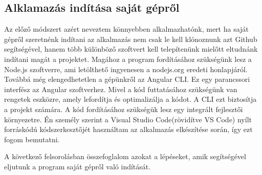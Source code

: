 \subsection{Alklamazás indítása saját gépről}
Az előző  módszert azért neveztem könnyebben alkalmazhatónk, mert ha saját gépről szeretnénk indítani az alkalmazás nem csak le kell klónoznunk azt Github segítségével, hanem több különböző szoftvert kell telepítenünk mielőtt eltudnánk indítani magát a projektet. Magához a program fordításához szükségünk lesz a Node.js szoftverre, ami letölthető ingyenesen a nodejs.org eredeti honlapjáról. Továbbá még elengedhetetlen a gépünkről az Angular CLI. Ez egy parancssori interfész az Angular szoftverhez. Mivel a kód futtatásához szükségünk van rengetek eszközre, amely lefordítja és optimalizálja a kódot. A CLI ezt biztosítja a projekt számára. A kód fordításához szükségük lesz egy integrált fejlesztői környezetre. Én személy szerint a Visual Studio Code(rövidítve VS Code) nyílt forráskódú kódszerkesztőjét használtam az alkalmazás elkészítése során, így ezt fogom bemutatni.

A következő felsorolásban összefoglalom azokat a lépéseket, amik segítségével eljutunk a program saját gépről való indítását.

